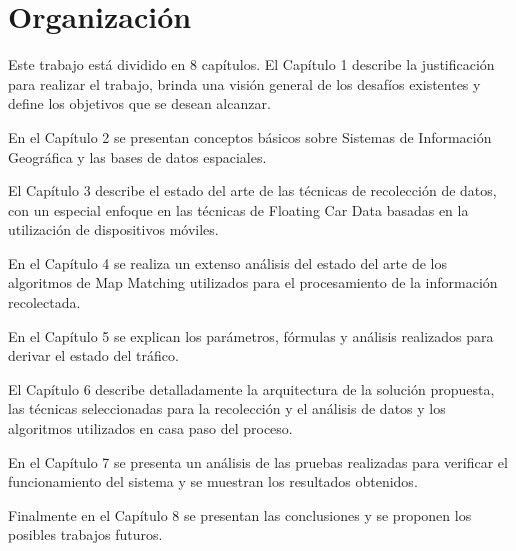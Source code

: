 \section{Organización}

Este trabajo está dividido en 8 capítulos. El Capítulo 1 describe la justificación para realizar el trabajo, brinda una visión general de los desafíos existentes y define los objetivos que se desean alcanzar.

En el Capítulo 2 se presentan conceptos básicos sobre Sistemas de Información Geográfica y las bases de datos espaciales.

El Capítulo 3 describe el estado del arte de las técnicas de recolección de datos, con un especial enfoque en las técnicas de Floating Car Data basadas en la utilización de dispositivos móviles. 

En el Capítulo 4 se realiza un extenso análisis del estado del arte de los algoritmos de Map Matching utilizados para el procesamiento de la información recolectada.

En el Capítulo 5 se explican los parámetros, fórmulas y análisis realizados para derivar el estado del tráfico.

El Capítulo 6 describe detalladamente la arquitectura de la solución propuesta, las técnicas seleccionadas para la recolección y el análisis de datos y los algoritmos utilizados en casa paso del proceso.

En el Capítulo 7 se presenta un análisis de las pruebas realizadas para verificar el funcionamiento del sistema y se muestran los resultados obtenidos.

Finalmente en el Capítulo 8 se presentan las conclusiones y se proponen los posibles trabajos futuros.
